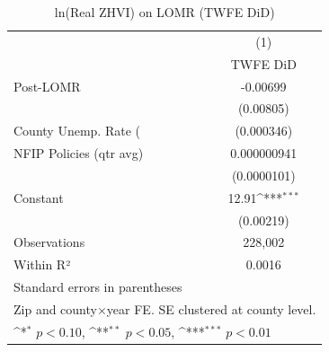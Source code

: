 \begin{table}[htbp]\centering
\def\sym#1{\ifmmode^{#1}\else\(^{#1}\)\fi}
\caption{ln(Real ZHVI) on LOMR (TWFE DiD)}
\begin{tabular}{l*{1}{c}}
\hline\hline
                    &\multicolumn{1}{c}{(1)}\\
                    &\multicolumn{1}{c}{TWFE DiD}\\
\hline
Post-LOMR           &    -0.00699         \\
                    &   (0.00805)         \\
[1em]
County Unemp. Rate (%
                    &  (0.000346)         \\
[1em]
NFIP Policies (qtr avg)& 0.000000941         \\
                    & (0.0000101)         \\
[1em]
Constant            &       12.91\sym{***}\\
                    &   (0.00219)         \\
\hline
Observations        &     228,002         \\
Within R²           &      0.0016         \\
\hline\hline
\multicolumn{2}{l}{\footnotesize Standard errors in parentheses}\\
\multicolumn{2}{l}{\footnotesize Zip and county×year FE. SE clustered at county level.}\\
\multicolumn{2}{l}{\footnotesize \sym{*} \(p<0.10\), \sym{**} \(p<0.05\), \sym{***} \(p<0.01\)}\\
\end{tabular}
\end{table}

